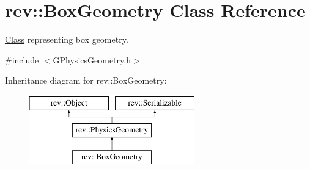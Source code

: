 \hypertarget{classrev_1_1_box_geometry}{}\section{rev\+::Box\+Geometry Class Reference}
\label{classrev_1_1_box_geometry}


\mbox{\hyperlink{struct_class}{Class}} representing box geometry.  




{\ttfamily \#include $<$G\+Physics\+Geometry.\+h$>$}

Inheritance diagram for rev\+::Box\+Geometry\+:\begin{figure}[H]
\begin{center}
\leavevmode
\includegraphics[height=3.000000cm]{classrev_1_1_box_geometry}
\end{center}
\end{figure}
